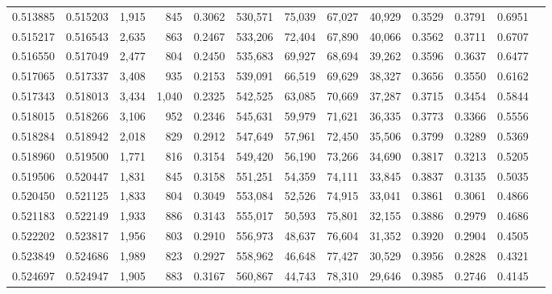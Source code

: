 \begin{tabular}{rrrrrrrrrrrrr}
0.513885 & 0.515203 &  1,915 &   845 &                                     0.3062 & 530,571 &  75,039 &  67,027 &  40,929 & 0.3529 & 0.3791 & 0.6951 \\
0.515217 & 0.516543 &  2,635 &   863 &                                     0.2467 & 533,206 &  72,404 &  67,890 &  40,066 & 0.3562 & 0.3711 & 0.6707 \\
0.516550 & 0.517049 &  2,477 &   804 &                                     0.2450 & 535,683 &  69,927 &  68,694 &  39,262 & 0.3596 & 0.3637 & 0.6477 \\
0.517065 & 0.517337 &  3,408 &   935 &                                     0.2153 & 539,091 &  66,519 &  69,629 &  38,327 & 0.3656 & 0.3550 & 0.6162 \\
0.517343 & 0.518013 &  3,434 & 1,040 &                                     0.2325 & 542,525 &  63,085 &  70,669 &  37,287 & 0.3715 & 0.3454 & 0.5844 \\
0.518015 & 0.518266 &  3,106 &   952 &                                     0.2346 & 545,631 &  59,979 &  71,621 &  36,335 & 0.3773 & 0.3366 & 0.5556 \\
0.518284 & 0.518942 &  2,018 &   829 &                                     0.2912 & 547,649 &  57,961 &  72,450 &  35,506 & 0.3799 & 0.3289 & 0.5369 \\
0.518960 & 0.519500 &  1,771 &   816 &                                     0.3154 & 549,420 &  56,190 &  73,266 &  34,690 & 0.3817 & 0.3213 & 0.5205 \\
0.519506 & 0.520447 &  1,831 &   845 &                                     0.3158 & 551,251 &  54,359 &  74,111 &  33,845 & 0.3837 & 0.3135 & 0.5035 \\
0.520450 & 0.521125 &  1,833 &   804 &                                     0.3049 & 553,084 &  52,526 &  74,915 &  33,041 & 0.3861 & 0.3061 & 0.4866 \\
0.521183 & 0.522149 &  1,933 &   886 &                                     0.3143 & 555,017 &  50,593 &  75,801 &  32,155 & 0.3886 & 0.2979 & 0.4686 \\
0.522202 & 0.523817 &  1,956 &   803 &                                     0.2910 & 556,973 &  48,637 &  76,604 &  31,352 & 0.3920 & 0.2904 & 0.4505 \\
0.523849 & 0.524686 &  1,989 &   823 &                                     0.2927 & 558,962 &  46,648 &  77,427 &  30,529 & 0.3956 & 0.2828 & 0.4321 \\
0.524697 & 0.524947 &  1,905 &   883 &                                     0.3167 & 560,867 &  44,743 &  78,310 &  29,646 & 0.3985 & 0.2746 & 0.4145 \\

\end{tabular}
